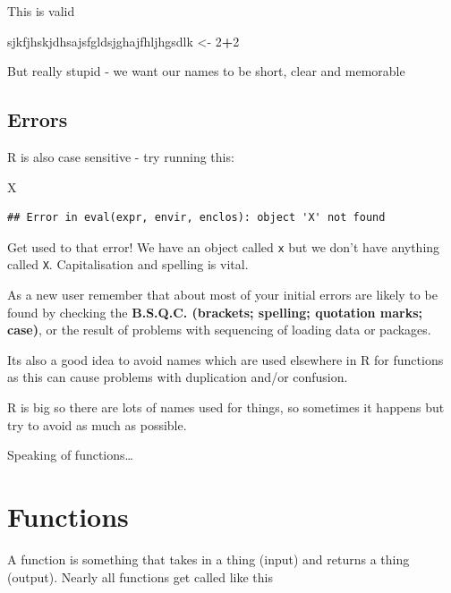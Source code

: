 \documentclass[]{book}
\newenvironment{Shaded}{\begin{snugshade}}{\end{snugshade}}
\newcommand{\DecValTok}[1]{\textcolor[rgb]{0.00,0.00,0.81}{#1}}
\newcommand{\NormalTok}[1]{#1}
\newcommand{\OperatorTok}[1]{\textcolor[rgb]{0.81,0.36,0.00}{\textbf{#1}}}
\newcommand{\StringTok}[1]{\textcolor[rgb]{0.31,0.60,0.02}{#1}}
\begin{document}
This is valid

\begin{Shaded}
\begin{Highlighting}[]
\NormalTok{sjkfjhskjdhsajsfgldsjghajfhljhgsdlk <-}\StringTok{ }\DecValTok{2}\OperatorTok{+}\DecValTok{2}
\end{Highlighting}
\end{Shaded}

But really stupid - we want our names to be short, clear and memorable

\hypertarget{errors}{%
\subsection{Errors}\label{errors}}

R is also case sensitive - try running this:

\begin{Shaded}
\begin{Highlighting}[]
\NormalTok{X}
\end{Highlighting}
\end{Shaded}

\begin{verbatim}
## Error in eval(expr, envir, enclos): object 'X' not found
\end{verbatim}

Get used to that error! We have an object called \texttt{x} but we don't have anything called \texttt{X}. Capitalisation and spelling is vital.

As a new user remember that about most of your initial errors are likely to be found by checking the \textbf{B.S.Q.C. (brackets; spelling; quotation marks; case)}, or the result of problems with sequencing of loading data or packages.

Its also a good idea to avoid names which are used elsewhere in R for functions as this can cause problems with duplication and/or confusion.

R is big so there are lots of names used for things, so sometimes it happens but try to avoid as much as possible.

Speaking of functions\ldots{}

\hypertarget{functions}{%
\section{Functions}\label{functions}}

A function is something that takes in a thing (input) and returns a thing (output). Nearly all functions get called like this
\end{document}
